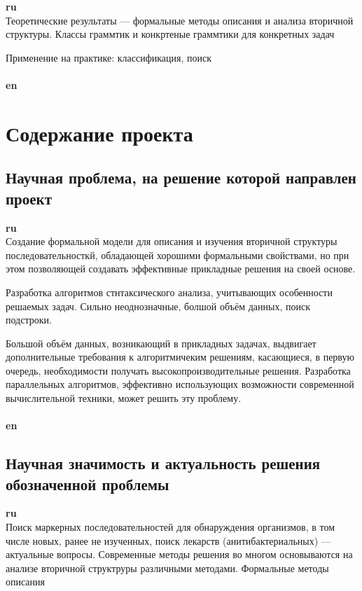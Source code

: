 \documentclass[12pt]{article}  %
\theoremstyle{remark}
\begin{document}
\textbf{ru}\\
Теоретические результаты --- формальные методы описания и анализа вторичной структуры.
Классы граммтик и конкртеные граммтики для конкретных задач

Применение на практике: классификация, поиск
\\
\\
\textbf{en}\\


\section{Содержание проекта}

\subsection{Научная проблема, на решение которой направлен проект}

\textbf{ru}\\
Создание формальной модели для описания и изучения вторичной структуры последовательносткй, обладающей хорошими формальными свойствами, но при этом позволяющей создавать эффективные прикладные решения на своей основе.

Разработка алгоритмов стнтаксического анализа, учитывающих особенности решаемых задач.
Сильно неоднозначные, болшой объём данных, поиск подстроки.

Большой объём данных, возникающий в прикладных задачах, выдвигает дополнительные требования к алгоритмичеким решениям, касающиеся, в первую очередь, необходимости получать высокопроизводительные решения.
Разработка параллельных алгоритмов, эффективно использующих возможности современной вычислительной техники, может решить эту проблему.
\\
\\
\textbf{en}\\



\subsection{Научная значимость и актуальность решения обозначенной проблемы}

\textbf{ru}\\
Поиск маркерных последовательностей для обнаруждения организмов, в том числе новых, ранее не изученных, поиск лекарств (анитибактериальных) --- актуальные вопросы.
Современные методы решения во многом основываются на анализе вторичной структруры различными методами.
Формальные методы описания
\end{document}

